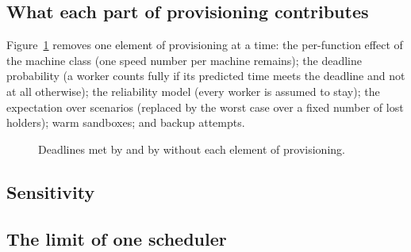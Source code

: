 \subsection{What each part of provisioning contributes}
\label{sec:res-ablation}

Figure~\ref{fig:ablation} removes one element of provisioning at a time: the per-function effect of the machine class
(one speed number per machine remains); the deadline probability (a worker counts fully if its predicted time meets
the deadline and not at all otherwise); the reliability model (every worker is assumed to stay); the expectation over
scenarios (replaced by the worst case over a fixed number of lost holders); warm sandboxes; and backup attempts.

\begin{figure}[t]
\centering
{}
\caption{Deadlines met by \voss{} and by \voss{} without each element of provisioning.}
\label{fig:ablation}
\end{figure}

\subsection{Sensitivity}
\label{sec:res-sens}


\subsection{The limit of one scheduler}
\label{sec:res-scale}

